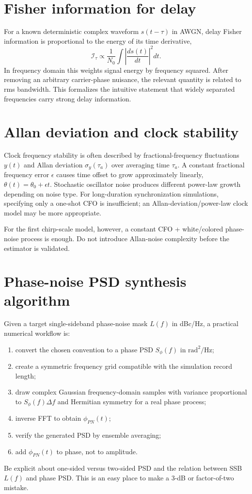\documentclass[11pt]{article}
\begin{document}
\section{Fisher information for delay}
For a known deterministic complex waveform $s(t-\tau)$ in AWGN, delay Fisher information is proportional to the energy of its time derivative,
\[
\mathcal I_\tau\propto \frac{1}{N_0}\int \left|\frac{ds(t)}{dt}\right|^2dt.
\]
In frequency domain this weights signal energy by frequency squared. After removing an arbitrary carrier-phase nuisance, the relevant quantity is related to rms bandwidth. This formalizes the intuitive statement that widely separated frequencies carry strong delay information.

\section{Allan deviation and clock stability}
Clock frequency stability is often described by fractional-frequency fluctuations $y(t)$ and Allan deviation $\sigma_y(\tau_a)$ over averaging time $\tau_a$. A constant fractional frequency error $\epsilon$ causes time offset to grow approximately linearly, $\theta(t)=\theta_0+\epsilon t$. Stochastic oscillator noise produces different power-law growth depending on noise type. For long-duration synchronization simulations, specifying only a one-shot CFO is insufficient; an Allan-deviation/power-law clock model may be more appropriate.

For the first chirp-scale model, however, a constant CFO + white/colored phase-noise process is enough. Do not introduce Allan-noise complexity before the estimator is validated.

\section{Phase-noise PSD synthesis algorithm}
Given a target single-sideband phase-noise mask $L(f)$ in dBc/Hz, a practical numerical workflow is:
\begin{enumerate}
\item convert the chosen convention to a phase PSD $S_\phi(f)$ in $\mathrm{rad}^2/\mathrm{Hz}$;
\item create a symmetric frequency grid compatible with the simulation record length;
\item draw complex Gaussian frequency-domain samples with variance proportional to $S_\phi(f)\Delta f$ and Hermitian symmetry for a real phase process;
\item inverse FFT to obtain $\phi_{PN}(t)$;
\item verify the generated PSD by ensemble averaging;
\item add $\phi_{PN}(t)$ to phase, not to amplitude.
\end{enumerate}
Be explicit about one-sided versus two-sided PSD and the relation between SSB $L(f)$ and phase PSD. This is an easy place to make a 3-dB or factor-of-two mistake.
\end{document}
